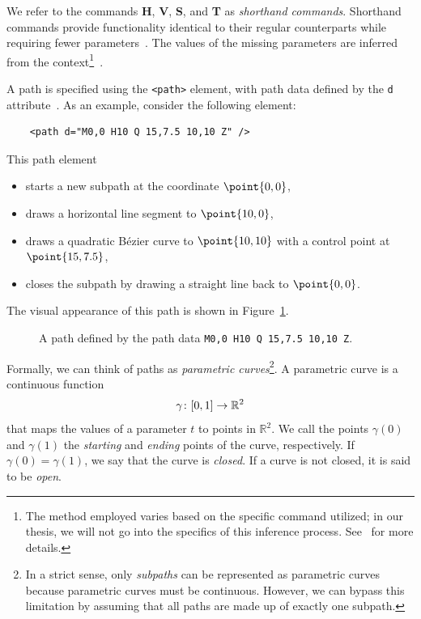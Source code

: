 We refer to the commands \textbf{H}, \textbf{V}, \textbf{S}, and \textbf{T} as \emph{shorthand commands}. Shorthand commands provide functionality identical to their regular counterparts while requiring fewer parameters~\cite[Sec.~8.3]{svg11}. The values of the missing parameters are inferred from the context\footnote{The method employed varies based on the specific command utilized; in our thesis, we will not go into the specifics of this inference process. See~\cite[Sec.~8.3]{svg11} for more details.}~\cite[Sec.~8.3.2]{svg11}.

A path is specified using the \texttt{<path>} element, with path data defined by the \texttt{d} attribute~\cite[Sec.~8.2]{svg11}. As an example, consider the following element:
\begin{verbatim}
    <path d="M0,0 H10 Q 15,7.5 10,10 Z" />
\end{verbatim}
This path element
\begin{itemize}
    \item starts a new subpath at the coordinate $\point{0, 0}$,
    \item draws a horizontal line segment to $\point{10, 0}$,
    \item draws a quadratic Bézier curve to $\point{10, 10}$ with a control point at $\point{15, 7.5}$,
    \item closes the subpath by drawing a straight line back to $\point{0, 0}$.
\end{itemize}
The visual appearance of this path is shown in Figure~\ref{fig:example-path}.

\begin{figure}[H]
    \centering
    \caption{A path defined by the path data \texttt{M0,0 H10 Q 15,7.5 10,10 Z}.}
    \label{fig:example-path}
\end{figure}

Formally, we can think of paths as \emph{parametric curves}\footnote{In a strict sense, only \emph{subpaths} can be represented as parametric curves because parametric curves must be continuous. However, we can bypass this limitation by assuming that all paths are made up of exactly one subpath.}. A parametric curve is a continuous function
\[
    \gamma\colon\interval[scaled]{0}{1}\to\mathbb{R}^2
\]
that maps the values of a parameter $t$ to points in $\mathbb{R}^2$. We call the points $\gamma(0)$ and $\gamma(1)$ the \emph{starting} and \emph{ending} points of the curve, respectively. If $\gamma(0) = \gamma(1)$, we say that the curve is \emph{closed}. If a curve is not closed, it is said to be \emph{open}.

